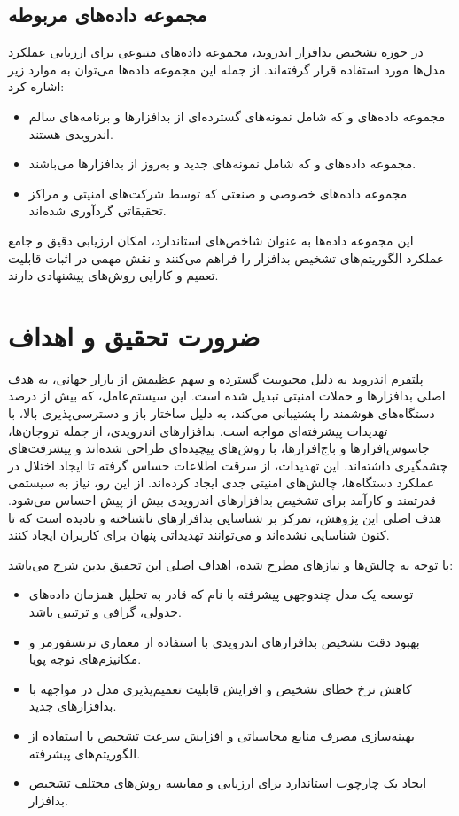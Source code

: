 \subsection{مجموعه داده‌های مربوطه}
در حوزه تشخیص بدافزار اندروید، مجموعه داده‌های متنوعی برای ارزیابی عملکرد مدل‌ها مورد استفاده قرار گرفته‌اند. از جمله این مجموعه داده‌ها می‌توان به موارد زیر اشاره کرد:
\begin{itemize}
    \item مجموعه داده‌های  \cite{Drebin} و  \cite{AndroZoo} که شامل نمونه‌های گسترده‌ای از بدافزارها و برنامه‌های سالم اندرویدی هستند.
    \item مجموعه داده‌های  \cite{CICMalDroid} و  که شامل نمونه‌های جدید و به‌روز از بدافزارها می‌باشند.
    \item مجموعه داده‌های خصوصی و صنعتی که توسط شرکت‌های امنیتی و مراکز تحقیقاتی گردآوری شده‌اند.
\end{itemize}
این مجموعه داده‌ها به عنوان شاخص‌های استاندارد، امکان ارزیابی دقیق و جامع عملکرد الگوریتم‌های تشخیص بدافزار را فراهم می‌کنند و نقش مهمی در اثبات قابلیت تعمیم و کارایی روش‌های پیشنهادی دارند.

\section{ضرورت تحقیق و اهداف}\label{import}
پلتفرم اندروید به دلیل محبوبیت گسترده و سهم عظیمش از بازار جهانی، به هدف اصلی بدافزارها و حملات امنیتی تبدیل شده است. این سیستم‌عامل، که بیش از  درصد دستگاه‌های هوشمند را پشتیبانی می‌کند، به دلیل ساختار باز و دسترسی‌پذیری بالا، با تهدیدات پیشرفته‌ای مواجه است. بدافزارهای اندرویدی، از جمله تروجان‌ها، جاسوس‌افزارها و باج‌افزارها، با روش‌های پیچیده‌ای طراحی شده‌اند و پیشرفت‌های چشمگیری داشته‌اند. این تهدیدات، از سرقت اطلاعات حساس گرفته تا ایجاد اختلال در عملکرد دستگاه‌ها، چالش‌های امنیتی جدی ایجاد کرده‌اند. از این رو، نیاز به سیستمی قدرتمند و کارآمد برای تشخیص بدافزارهای اندرویدی بیش از پیش احساس می‌شود. هدف اصلی این پژوهش، تمرکز بر شناسایی بدافزارهای ناشناخته و نادیده  است که تا کنون شناسایی نشده‌اند و می‌توانند تهدیداتی پنهان برای کاربران ایجاد کنند.

با توجه به چالش‌ها و نیازهای مطرح شده، اهداف اصلی این تحقیق بدین شرح می‌باشد:
\begin{itemize}
    \item توسعه یک مدل چندوجهی پیشرفته با نام  که قادر به تحلیل همزمان داده‌های جدولی، گرافی و ترتیبی باشد.
    \item بهبود دقت تشخیص بدافزارهای اندرویدی با استفاده از معماری ترنسفورمر و مکانیزم‌های توجه پویا.
    \item کاهش نرخ خطای تشخیص و افزایش قابلیت تعمیم‌پذیری مدل در مواجهه با بدافزارهای جدید.
    \item بهینه‌سازی مصرف منابع محاسباتی و افزایش سرعت تشخیص با استفاده از الگوریتم‌های پیشرفته.
    \item ایجاد یک چارچوب استاندارد برای ارزیابی و مقایسه روش‌های مختلف تشخیص بدافزار.
\end{itemize}

